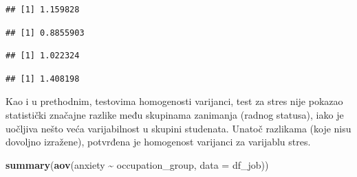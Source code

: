 \documentclass[
]{article}
\newenvironment{Shaded}{\begin{snugshade}}{\end{snugshade}}
\newcommand{\AttributeTok}[1]{\textcolor[rgb]{0.13,0.29,0.53}{#1}}
\newcommand{\FunctionTok}[1]{\textcolor[rgb]{0.13,0.29,0.53}{\textbf{#1}}}
\newcommand{\NormalTok}[1]{#1}
\newcommand{\SpecialCharTok}[1]{\textcolor[rgb]{0.81,0.36,0.00}{\textbf{#1}}}
\newcommand{\StringTok}[1]{\textcolor[rgb]{0.31,0.60,0.02}{#1}}
\begin{document}
\begin{verbatim}
## [1] 1.159828
\end{verbatim}

\begin{Shaded}
\end{Shaded}

\begin{verbatim}
## [1] 0.8855903
\end{verbatim}

\begin{Shaded}
\end{Shaded}

\begin{verbatim}
## [1] 1.022324
\end{verbatim}

\begin{Shaded}
\end{Shaded}

\begin{verbatim}
## [1] 1.408198
\end{verbatim}

Kao i u prethodnim, testovima homogenosti varijanci, test za stres nije
pokazao statistički značajne razlike među skupinama zanimanja (radnog
statusa), iako je uočljiva nešto veća varijabilnost u skupini studenata.
Unatoč razlikama (koje nisu dovoljno izražene), potvrđena je homogenost
varijanci za varijablu stres.

\begin{Shaded}
\begin{Highlighting}[]
\FunctionTok{summary}\NormalTok{(}\FunctionTok{aov}\NormalTok{(anxiety }\SpecialCharTok{\textasciitilde{}}\NormalTok{ occupation\_group, }\AttributeTok{data =}\NormalTok{ df\_job))}
\end{Highlighting}
\end{Shaded}
\end{document}
